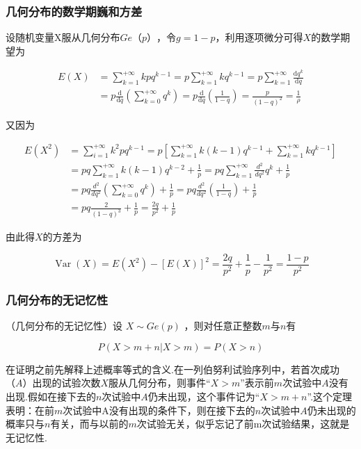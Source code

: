 \subsubsection{几何分布的数学期巍和方差}

设随机变量X服从几何分布$ Ge（p） $，令$ g=1-p $，利用逐项微分可得$ X $的数学期望为

\[
\begin{aligned} E(X) &=\sum_{k=1}^{+\infty} k p q^{k-1} =p \sum_{k=1}^{+\infty} k q^{k-1}=p \sum_{k=1}^{+\infty} \frac{\mathrm{d} q^{k}}{\mathrm{d} q} \\ &=p \frac{\mathrm{d}}{\mathrm{d} q}\left(\sum_{k=0}^{+\infty} q^{k}\right)=p \frac{\mathrm{d}}{\mathrm{d} q}\left(\frac{1}{1-q}\right)=\frac{p}{(1-q)^{2}}=\frac{1}{\rho} \end{aligned}
\]

又因为

\[
\begin{aligned} 
E\left(X^{2}\right) &=\sum_{i=1}^{+\infty} k^{2} p q^{k-1}=p\left[\sum_{k=1}^{+\infty} k(k-1) q^{k-1}+\sum_{k=1}^{+\infty} k q^{k-1}\right] \\ 
&=p q \sum_{k=1}^{+\infty} k(k-1) q^{k-2}+\frac{1}{p}=p q \sum_{k=1}^{+\infty} \frac{d^{2}}{d q^{2}} q^{k}+\frac{1}{p}\\
&  {=p q \frac{d^{2}}{d q^{2}}\left(\sum_{k=0}^{+\infty} q^{k}\right)+\frac{1}{p}=p q \frac{d^{2}}{d q^{2}}\left(\frac{1}{1-q}\right)+\frac{1}{p}}\\
& {=p q \frac{2}{(1-q)^{3}}+\frac{1}{p}=\frac{2 q}{p^{2}}+\frac{1}{p}}
\end{aligned}
\]

由此得$ X $的方差为

\[
\operatorname{Var}(X)=E\left(X^{2}\right)-[E(X)]^{2}=\frac{2 q}{p^{2}}+\frac{1}{p}-\frac{1}{p^{2}}=\frac{1-p}{p^{2}}
\]


\subsubsection{几何分布的无记忆性}

\begin{theorem}
	（几何分布的无记忆性）设 $X \sim G e(p)$ ，则对任意正整数$ m $与$ n $有
	
	\begin{equation}
	P(X>m+n | X>m)=P(X>n) \label{eq:2.4.9}
	\end{equation}
\end{theorem}

在证明之前先解释上述概率等式的含义.在一列伯努利试验序列中，若首次成功$ （A） $出现的试验次数$ X $服从几何分布，则事件“$ X>m $”表示前$ m $次试验中$ A $没有出现.假如在接下去的$ n $次试验中$ A $仍未出现，这个事件记为“$ X>m+n $”.这个定理表明：在前$ m $次试验中A没有出现的条件下，则在接下去的$ n $次试验中$ A $仍未出现的概率只与$ n $有关，而与以前的$ m $次试验无关，似乎忘记了前m次试验结果，这就是无记忆性.


